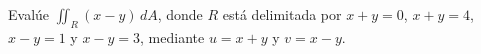 Evalúe $\iint_R(x-y)\,dA$, donde $R$ está delimitada por $x+y=0$, $x+y=4$, $x-y=1$ y $x-y=3$, mediante $u=x+y$ y $v=x-y$.
